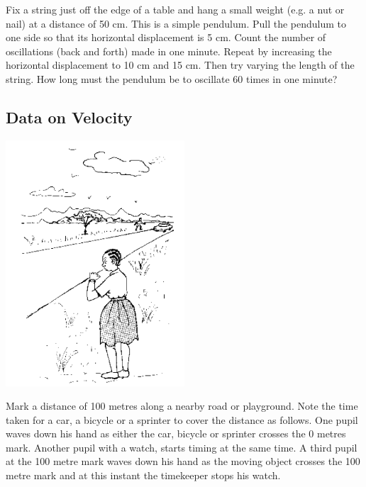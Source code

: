 \begin{multicols}{2}
Fix a string just off the edge of a table and hang a small weight (e.g. a nut or nail) at a distance of 50 cm. This is a simple pendulum. Pull the pendulum to one side so that its horizontal displacement is 5 cm. Count the number of oscillations (back and forth) made in one minute. Repeat by increasing the horizontal displacement to 10 cm and 15 cm. Then try varying the length of the string. How long must the pendulum be to oscillate 60 times in one minute?

\vfill
\columnbreak

\subsection{Data on Velocity}

\begin{center}
\includegraphics[width=0.5\textwidth]{./img/source/meas-velocity.png}
\end{center}

Mark a distance of 100 metres along a nearby road or playground. Note the time taken for a
car, a bicycle or a sprinter to cover the distance as follows. One pupil waves down his hand
as either the car, bicycle or sprinter crosses the 0 metres mark. Another pupil with a watch,
starts timing at the same time. A third pupil at the 100 metre mark waves down his hand as
the moving object crosses the 100 metre mark and at this instant the timekeeper stops his
watch.

\vfill
\columnbreak



\end{multicols}

